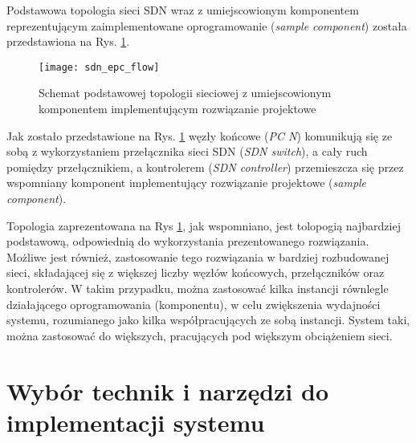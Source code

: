 Podstawowa topologia sieci SDN wraz z umiejscowionym komponentem reprezentującym
zaimplementowane oprogramowanie (\textit{sample component}) została
przedstawiona na Rys. \ref{fig:sdn_epc_flow}. 

\begin{figure}[h]
\centering
\texttt{[image: sdn\_epc\_flow]}
\caption{Schemat podstawowej topologii sieciowej z umiejscowionym komponentem
  implementującym rozwiązanie projektowe}
\label{fig:sdn_epc_flow}
\end{figure}

Jak zostało przedstawione na Rys. \ref{fig:sdn_epc_flow} węzły końcowe
(\textit{PC N}) komunikują się ze sobą z wykorzystaniem przełącznika sieci SDN
(\textit{SDN switch}), a cały ruch pomiędzy przełącznikiem, a kontrolerem
(\textit{SDN controller}) przemieszcza się przez wspomniany komponent
implementujący rozwiązanie projektowe (\textit{sample component}).

Topologia zaprezentowana na Rys \ref{fig:sdn_epc_flow}, jak wspomniano, jest
tolopogią najbardziej podstawową, odpowiednią do wykorzystania prezentowanego
rozwiązania. Możliwe jest również, zastosowanie tego rozwiązania w bardziej
rozbudowanej sieci, składającej się z większej liczby węzłów końcowych, 
przełączników oraz kontrolerów. W takim przypadku, można zastosować kilka
instancji równlegle działającego oprogramowania (komponentu), w celu
zwiększenia wydajności systemu, rozumianego jako kilka współpracujących ze sobą
instancji. System taki, można zastosować do większych, pracujących pod większym
obciążeniem sieci. 

\section{Wybór technik i narzędzi do implementacji systemu}